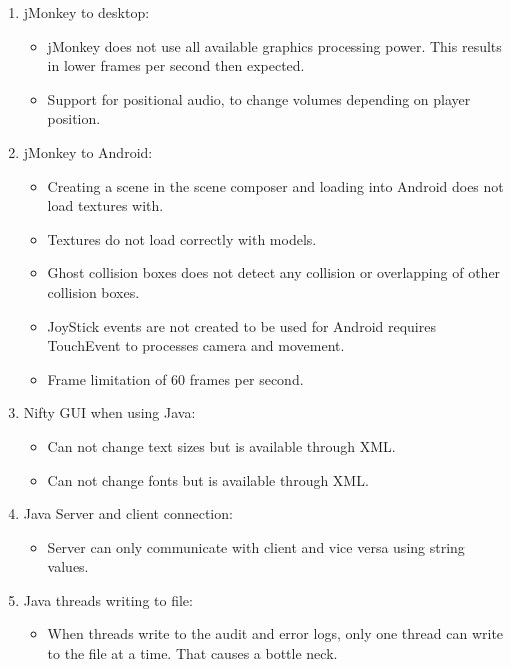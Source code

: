 \documentclass[letterpaper]{article}
\begin{document}
			\begin{enumerate}
				\item jMonkey to desktop:
					\begin{itemize}
						\item jMonkey does not use all available graphics processing power. This results in lower frames per second then expected.
						\item Support for positional audio, to change volumes depending on player position. \\
					\end{itemize}
				
				\item jMonkey to Android:
					\begin{itemize}
						\item Creating a scene in the scene composer and loading into Android does not load textures with.
						\item Textures do not load correctly with models.
						\item Ghost collision boxes does not detect any collision or overlapping of other collision boxes.
						\item JoyStick events are not created to be used for Android requires TouchEvent to processes camera and movement.
						\item Frame limitation of 60 frames per second. \\
					\end{itemize}
				
				\item Nifty GUI when using Java:
					\begin{itemize}
						\item Can not change text sizes but is available through XML.
						\item Can not change fonts but is available through XML.
					\end{itemize}
					
					\item Java Server and client connection:
					\begin{itemize}
						\item Server can only communicate with client and vice versa using string values. 
					\end{itemize}
					\item Java threads writing to file:
					\begin{itemize}
						\item When threads write to the audit and error logs, only one thread can write to the file at a time. That causes a bottle neck. 
					\end{itemize}
			\end{enumerate}
				
\end{document}
